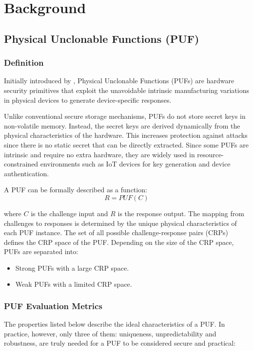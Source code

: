 
\chapter{Background}
\label{chapter:background}
\section{Physical Unclonable Functions (PUF)}
\subsection{Definition}
Initially introduced by \cite{doi:10.1126/science.1074376}, Physical Unclonable Functions (PUFs) are hardware security primitives that exploit the unavoidable intrinsic manufacturing variations in physical devices to generate device-specific responses. 

Unlike conventional secure storage mechanisms, PUFs do not store secret keys in non-volatile memory. Instead, the secret keys are derived dynamically from the physical characteristics of the hardware. This increases protection against attacks since there is no static secret that can be directly extracted. Since some PUFs are intrinsic and require no extra hardware, they are widely used in resource-constrained environments such as IoT devices for key generation and device authentication.

A PUF can be formally described as a function:
\[R = PUF(C)\]

where $C$ is the challenge input and $R$ is the response output. The mapping from challenges to responses is determined by the unique physical characteristics of each PUF instance. The set of all possible challenge-response pairs (CRPs) defines the CRP space of the PUF. Depending on the size of the CRP space, PUFs are separated into:
\begin{itemize}
    \item Strong PUFs with a large CRP space.
    \item Weak PUFs with a limited CRP space.
\end{itemize}

\subsection{PUF Evaluation Metrics}
The properties listed below describe the ideal characteristics of a PUF. In practice, however, only three of them: uniqueness, unpredictability and robustness, are truly needed for a PUF to be considered secure and practical:

